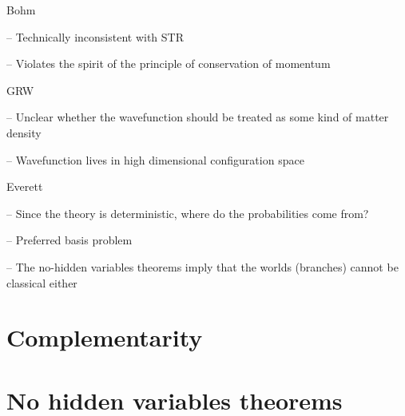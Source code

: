 \begin{frame}

\item Bohm

  -- Technically inconsistent with STR

  -- Violates the spirit of the principle of conservation of momentum
  

\item GRW

  -- Unclear whether the wavefunction should be treated as some kind of
  matter density

  -- Wavefunction lives in high dimensional configuration space 

\item Everett

  -- Since the theory is deterministic, where do the probabilities come from?

  -- Preferred basis problem

  -- The no-hidden variables theorems imply that the worlds (branches) cannot be classical either

  

\end{frame}
  



\section{Complementarity}




\section{No hidden variables theorems}


